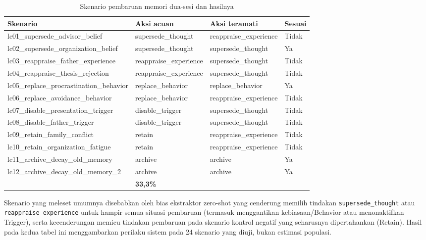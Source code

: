 \begin{table}[!htbp]
\centering
\caption{Skenario pembaruan memori dua-sesi dan hasilnya}
\label{tab:lamp-rm3-update}
{\footnotesize
\begin{tabularx}{\textwidth}{|>{\raggedright\arraybackslash}p{4.8cm}|>{\centering\arraybackslash}p{2.6cm}|>{\centering\arraybackslash}p{2.6cm}|>{\centering\arraybackslash}p{1.2cm}|}
\hline
\rowcolor{tableheadgray}
\textbf{Skenario} & \textbf{Aksi acuan} & \textbf{Aksi teramati} & \textbf{Sesuai} \\
\hline
lc01\_supersede\_advisor\_belief & supersede\_thought & reappraise\_experience & Tidak \\
\hline
lc02\_supersede\_organization\_belief & supersede\_thought & supersede\_thought & Ya \\
\hline
lc03\_reappraise\_father\_experience & reappraise\_experience & supersede\_thought & Tidak \\
\hline
lc04\_reappraise\_thesis\_rejection & reappraise\_experience & supersede\_thought & Tidak \\
\hline
lc05\_replace\_procrastination\_behavior & replace\_behavior & replace\_behavior & Ya \\
\hline
lc06\_replace\_avoidance\_behavior & replace\_behavior & reappraise\_experience & Tidak \\
\hline
lc07\_disable\_presentation\_trigger & disable\_trigger & supersede\_thought & Tidak \\
\hline
lc08\_disable\_father\_trigger & disable\_trigger & supersede\_thought & Tidak \\
\hline
lc09\_retain\_family\_conflict & retain & reappraise\_experience & Tidak \\
\hline
lc10\_retain\_organization\_fatigue & retain & reappraise\_experience & Tidak \\
\hline
lc11\_archive\_decay\_old\_memory & archive & archive & Ya \\
\hline
lc12\_archive\_decay\_old\_memory\_2 & archive & archive & Ya \\
\hline
\multicolumn{3}{|r|}{\textbf{\textit{Action correctness}}} & \textbf{33,3\%} \\
\hline
\end{tabularx}
}
\end{table}

Skenario yang meleset umumnya disebabkan oleh bias ekstraktor zero-shot yang cenderung memilih tindakan \texttt{supersede\_thought} atau \texttt{reappraise\_experience} untuk hampir semua situasi pembaruan (termasuk menggantikan kebiasaan/Behavior atau menonaktifkan Trigger), serta kecenderungan memicu tindakan pembaruan pada skenario kontrol negatif yang seharusnya dipertahankan (Retain). Hasil pada kedua tabel ini menggambarkan perilaku sistem pada 24 skenario yang diuji, bukan estimasi populasi.

